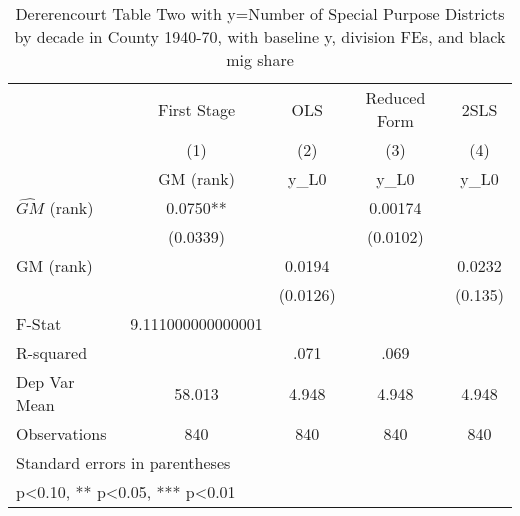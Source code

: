 \begin{table}[htbp]\centering
\def\sym#1{\ifmmode^{#1}\else\(^{#1}\)\fi}
\caption{Dererencourt Table Two with y=Number of Special Purpose Districts by decade in County 1940-70, with baseline y, division FEs, and black mig share}
\begin{tabular}{l*{4}{c}}
\toprule
                    & First Stage   &         OLS   &Reduced Form   &        2SLS   \\
                    &\multicolumn{1}{c}{(1)}&\multicolumn{1}{c}{(2)}&\multicolumn{1}{c}{(3)}&\multicolumn{1}{c}{(4)}\\
                    &\multicolumn{1}{c}{GM  (rank)}&\multicolumn{1}{c}{y\_L0}&\multicolumn{1}{c}{y\_L0}&\multicolumn{1}{c}{y\_L0}\\
\midrule
$\hat{GM}$ (rank)   &      0.0750** &               &     0.00174   &               \\
                    &    (0.0339)   &               &    (0.0102)   &               \\
\addlinespace
GM  (rank)          &               &      0.0194   &               &      0.0232   \\
                    &               &    (0.0126)   &               &     (0.135)   \\
\midrule
F-Stat              &9.111000000000001   &               &               &               \\
R-squared           &               &        .071   &        .069   &               \\
Dep Var Mean        &      58.013   &       4.948   &       4.948   &       4.948   \\
Observations        &         840   &         840   &         840   &         840   \\
\bottomrule
\multicolumn{5}{l}{\footnotesize Standard errors in parentheses}\\
\multicolumn{5}{l}{\footnotesize * p<0.10, ** p<0.05, *** p<0.01}\\
\end{tabular}
\end{table}
